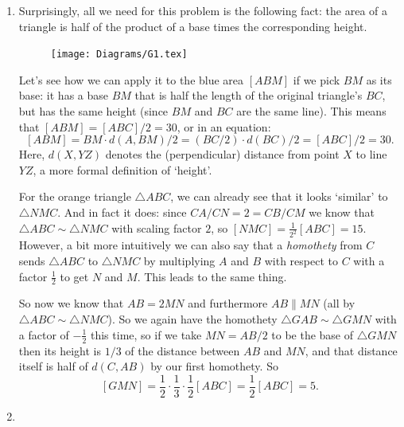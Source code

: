 \documentclass[11pt]{scrartcl}
\begin{document}
\begin{enumerate}[label=\textbf{G\arabic*}.]
    \item %

    Surprisingly, all we need for this problem is the following fact: the area of a triangle is half of the product of a base times the corresponding height.
    
    \begin{figure}[h]
        \centering
        \texttt{[image: Diagrams/G1.tex]}
        \label{fig:NMC1_G1}
    \end{figure}
    
    Let's see how we can apply it to the blue area $[ABM]$ if we pick $BM$ as its base: it has a base $BM$ that is half the length of the original triangle's $BC$, but has the same height (since $BM$ and $BC$ are the same line). This means that $[ABM] = [ABC]/2 = \boxed{30}$, or in an equation:
    \[
      [ABM] = BM \cdot d(A,BM) /2 = (BC/2) \cdot d(BC) /2 = [ABC]/2 = \boxed{30}. 
    \]
    Here, $d(X,YZ)$ denotes the (perpendicular) distance from point $X$ to line $YZ$, a more formal definition of `height'.
    
    For the orange triangle $\triangle ABC$, we can already see that it looks `similar' to $\triangle NMC$. And in fact it does: since $CA/CN = 2 = CB/CM$ we know that $\triangle ABC \sim \triangle NMC$ with scaling factor $2$, so $[NMC] = \frac{1}{2^2} [ABC] = \boxed{15}$. However, a bit more intuitively we can also say that a \emph{homothety} from $C$ sends $\triangle ABC$ to $\triangle NMC$ by multiplying $A$ and $B$ with respect to $C$ with a factor $\frac12$ to get $N$ and $M$. This leads to the same thing.
    
    So now we know that $AB = 2MN$ and furthermore $AB \parallel MN$ (all by $\triangle ABC \sim \triangle NMC$). So we again have the homothety $\triangle GAB \sim \triangle GMN$ with a factor of $-\frac12$ this time, so if we take $MN = AB/2$ to be the base of $\triangle GMN$ then its height is $1/3$ of the distance between $AB$ and $MN$, and that distance itself is half of $d(C, AB)$ by our first homothety. So \[ [GMN] = \frac12 \cdot \frac13 \cdot \frac 12 [ABC] = \frac12 [ABC] = \boxed{5}. \]
    
    \item 
    

\end{enumerate}
\end{document}
